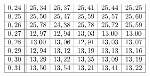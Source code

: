 \documentclass{article}
\begin{document}
\begin{multicols}{2}
$$\begin{array}{|c||c|c|c|c|c|}
        0,24 & 25,34 & 25,37 & 25,41 & 25,44 & 25,25 \\ \hline
        0,25 & 25,50 & 25,47 & 25,59 & 25,57 & 25,60 \\ \hline
        0,26 & 25,78 & 24,38 & 25,78 & 25,72 & 25,59 \\ \hline
        0,27 & 12,97 & 12,94 & 13,03 & 13.00 & 13.00 \\ \hline
        0,28 & 13.00 & 13,06 & 12,91 & 13,03 & 13,07 \\ \hline
        0,29 & 12,94 & 13,12 & 13,19 & 13,13 & 13,16 \\ \hline
        0,30 & 13,29 & 13,22 & 13,35 & 13,09 & 13,19 \\ \hline
        0,31 & 13,50 & 13,54 & 13,21 & 13,41 & 13,22 \\ \hline
    \end{array}
$$


\end{multicols}
\end{document}
